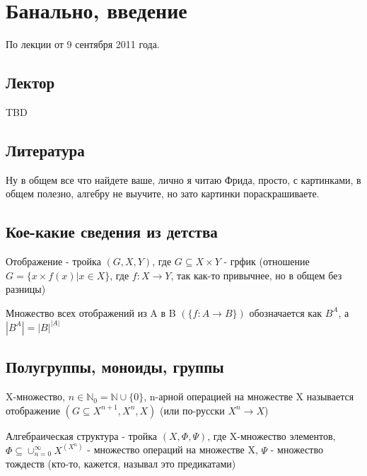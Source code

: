 \chapter{Банально, введение}

По лекции от 9 сентября 2011 года.

\section{Лектор}

TBD

\section{Литература}

Ну в общем все что найдете ваше, лично я читаю Фрида, просто, с картинками, в общем полезно, алгебру не выучите, но зато картинки пораскрашиваете.

\section{Кое-какие сведения из детства}

\begin{Def}
	Отображение - тройка $(G, X, Y)$, где $G \subseteq X \times Y$ - грфик (отношение $G = \{ x \times f(x) | x \in X \}$, где $f : X \rightarrow Y$, так как-то привычнее, но в общем без разницы)
\end{Def}

\begin{Def}
	Множество всех отображений из A в B $\left(\{ f: A \rightarrow B\}\right)$ обозначается как $B^A$, а $\left|B^A\right| = {\left|B\right|}^{\left|A\right|}$
\end{Def}

\section{Полугруппы, моноиды, группы}

\begin{Def}
	X-множество, $n \in {\mathbb{N}}_0 = \mathbb{N}\cup\{0\}$, n-арной операцией на множестве X называется отображение $\left(G \subseteq X^{n+1}, X^n, X\right)$ (или по-русски $X^n \rightarrow X$)
\end{Def}

\begin{Def}
	Алгебраическая структура - тройка $(X, \Phi, \Psi)$, где X-множество элементов, $\Phi \subseteq \cup_{n=0}^{\infty} X^{\left(X^n\right)}$ - множество операций на множестве X, $\Psi$ - множество тождеств (кто-то, кажется, называл это предикатами)
\end{Def}

